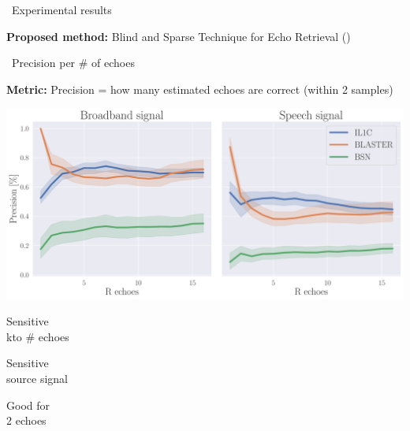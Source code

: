 \begin{frame}{\faFlask~Experimental results \hfill\faJediOrder}
    \pause
    \vfill
    \begin{mycontriblock}
        \textbf{Proposed method:} Blind and Sparse Technique for Echo Retrieval (\blaster)
    \end{mycontriblock}


\end{frame}


\begin{frame}{\faFlask~Precision per \# of echoes \hfill\faJediOrder}

    \textbf{Metric:} \alert{Precision} = how many estimated echoes are correct (within 2 samples)

    \begin{center}
        \includegraphics[width=0.8\linewidth]{figures/p_k-7_thr-2_bns_crocco_blaster-peak_withRechoes.pdf}
        \\
    \end{center}

    \begin{center}
        \textcolor{myred}{\xmark \: \parbox{8em}{Sensitive\\kto \# echoes}}
        \quad\textcolor{myred}{\xmark \: \parbox{8em}{Sensitive\\source signal}}
        \quad\textcolor{mygreen}{\cmark \: \parbox{8em}{Good for\\2 echoes}}
    \end{center}


\end{frame}

